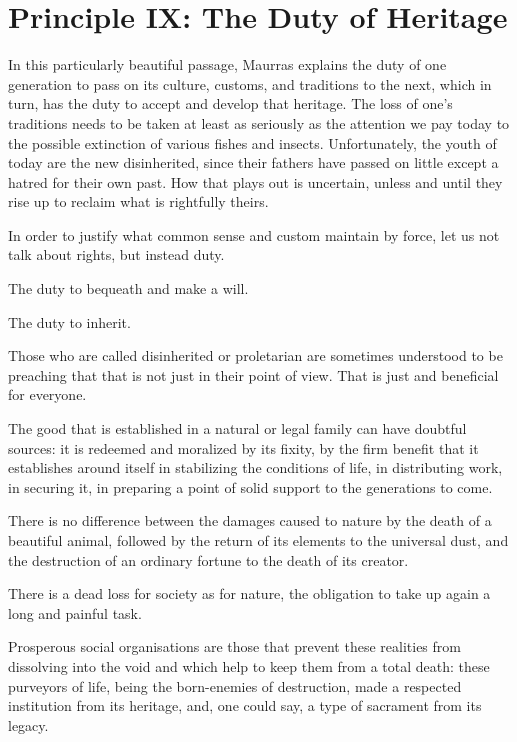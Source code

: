 \section{Principle IX: The Duty of Heritage}

\begin{quotex}
In this particularly beautiful passage, Maurras explains the duty of one generation to pass on its culture, customs, and traditions to the next, which in turn, has the duty to accept and develop that heritage. The loss of one's traditions needs to be taken at least as seriously as the attention we pay today to the possible extinction of various fishes and insects. Unfortunately, the youth of today are the new disinherited, since their fathers have passed on little except a hatred for their own past. How that plays out is uncertain, unless and until they rise up to reclaim what is rightfully theirs. 

\end{quotex}
In order to justify what common sense and custom maintain by force, let us not talk about rights, but instead duty.

The duty to bequeath and make a will.

The duty to inherit.

Those who are called disinherited or proletarian are sometimes understood to be preaching that that is not just in their point of view. That is just and beneficial for everyone.

The good that is established in a natural or legal family can have doubtful sources: it is redeemed and moralized by its fixity, by the firm benefit that it establishes around itself in stabilizing the conditions of life, in distributing work, in securing it, in preparing a point of solid support to the generations to come.

There is no difference between the damages caused to nature by the death of a beautiful animal, followed by the return of its elements to the universal dust, and the destruction of an ordinary fortune to the death of its creator.

There is a dead loss for society as for nature, the obligation to take up again a long and painful task.

Prosperous social organisations are those that prevent these realities from dissolving into the void and which help to keep them from a total death: these purveyors of life, being the born-enemies of destruction, made a respected institution from its heritage, and, one could say, a type of sacrament from its legacy.



